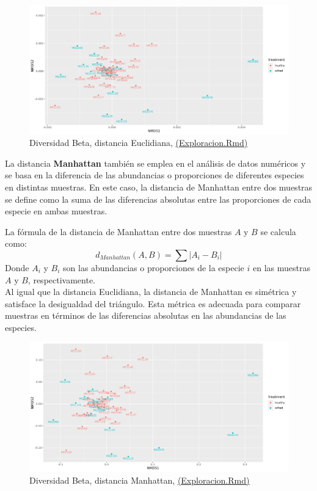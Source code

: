 \begin{figure}[!]
\centering
\includegraphics[width=\textwidth]{Img/cap2/DiversidadBetaFresaKraken_fil_euclidean.png}
\caption{Diversidad Beta, distancia Euclidiana, \href{https://github.com/CamilaSilva1995/Tesis_Maestria/blob/main/Analisis_Comparativo/Fresa_Solena/01_Exploracion.Rmd}{(Exploracion.Rmd)}}
\end{figure}

La distancia \textbf{Manhattan} también se emplea en el análisis de datos numéricos y se basa en la diferencia de las abundancias o proporciones de diferentes especies en distintas muestras. En este caso, la distancia de Manhattan entre dos muestras se define como la suma de las diferencias absolutas entre las proporciones de cada especie en ambas muestras.

La fórmula de la distancia de Manhattan entre dos muestras $A$ y $B$ se calcula como:
$$d_{Manhattan}(A, B) = \sum{|A_i - B_i|}$$
Donde $A_i$ y $B_i$ son las abundancias o proporciones de la especie $i$ en las muestras $A$ y $B$, respectivamente. \\

Al igual que la distancia Euclidiana, la distancia de Manhattan es simétrica y satisface la desigualdad del triángulo. Esta métrica es adecuada para comparar muestras en términos de las diferencias absolutas en las abundancias de las especies.\\

\begin{figure}[!]
\centering
\includegraphics[width=\textwidth]{Img/cap2/DiversidadBetaFresaKraken_fil_manhattan.png}
\caption{Diversidad Beta, distancia Manhattan,  \href{https://github.com/CamilaSilva1995/Tesis_Maestria/blob/main/Analisis_Comparativo/Fresa_Solena/01_Exploracion.Rmd}{(Exploracion.Rmd)}}
\end{figure}

